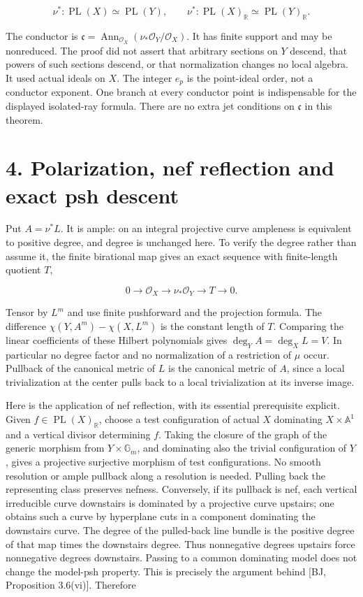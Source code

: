 \documentclass[11pt]{article}
\begin{document}
\[
 \nu^*:\operatorname{PL}(X)\simeq\operatorname{PL}(Y),
 \qquad \nu^*:\operatorname{PL}(X)_{\mathbb R}\simeq\operatorname{PL}(Y)_{\mathbb R}.
\]

The conductor is $\mathfrak c=\operatorname{Ann}_{\mathcal O_X}(\nu_*\mathcal O_Y/\mathcal O_X)$. It has finite support and may be nonreduced. The proof did not assert that arbitrary sections on $Y$ descend, that powers of such sections descend, or that normalization changes no local algebra. It used actual ideals on $X$. The integer $e_p$ is the point-ideal order, not a conductor exponent. One branch at every conductor point is indispensable for the displayed isolated-ray formula. There are no extra jet conditions on $\mathfrak c$ in this theorem.

\section*{4. Polarization, nef reflection and exact psh descent}
Put $A=\nu^*L$. It is ample: on an integral projective curve ampleness is equivalent to positive degree, and degree is unchanged here. To verify the degree rather than assume it, the finite birational map gives an exact sequence with finite-length quotient $T$,

\[
 0\longrightarrow\mathcal O_X\longrightarrow\nu_*\mathcal O_Y
 \longrightarrow T\longrightarrow0.
\]

Tensor by $L^m$ and use finite pushforward and the projection formula. The difference $\chi(Y,A^m)-\chi(X,L^m)$ is the constant length of $T$. Comparing the linear coefficients of these Hilbert polynomials gives $\deg_Y A=\deg_X L=V$. In particular no degree factor and no normalization of a restriction of $\mu$ occur. Pullback of the canonical metric of $L$ is the canonical metric of $A$, since a local trivialization at the center pulls back to a local trivialization at its inverse image.

Here is the application of nef reflection, with its essential prerequisite explicit. Given $f\in\operatorname{PL}(X)_{\mathbb R}$, choose a test configuration of actual $X$ dominating $X\times\mathbb A^1$ and a vertical divisor determining $f$. Taking the closure of the graph of the generic morphism from $Y\times\mathbb G_m$, and dominating also the trivial configuration of $Y$, gives a projective surjective morphism of test configurations. No smooth resolution or ample pullback along a resolution is needed. Pulling back the representing class preserves nefness. Conversely, if its pullback is nef, each vertical irreducible curve downstairs is dominated by a projective curve upstairs; one obtains such a curve by hyperplane cuts in a component dominating the downstairs curve. The degree of the pulled-back line bundle is the positive degree of that map times the downstairs degree. Thus nonnegative degrees upstairs force nonnegative degrees downstairs. Passing to a common dominating model does not change the model-psh property. This is precisely the argument behind [BJ, Proposition 3.6(vi)]. Therefore
\end{document}

